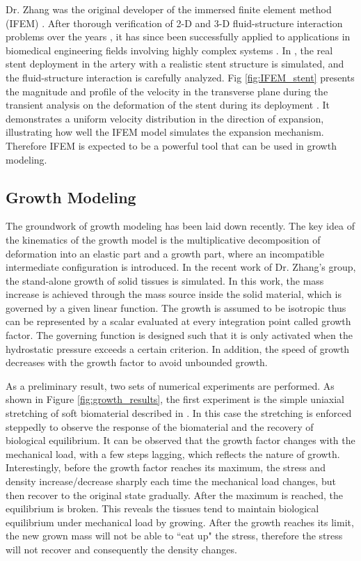 \documentclass[12pt]{article}
\begin{document}
Dr. Zhang was the original developer of the immersed finite element method (IFEM) \cite{Zhang}. After thorough verification of 2-D and 3-D fluid-structure interaction problems over the years \cite{Zhang,Zhang2,Zhang3,Zhang4,Zhang5,Zhang6,Zhang7,Zhang8} , it has since been successfully applied to applications in biomedical engineering fields involving highly complex systems \cite{Zhang9,Zhang10,Zhang11,Zhang12,Zhang13,Zhang14,Zhang15,Zhang18}. In \cite{Zhang10}, the real stent deployment in the artery with a realistic stent structure is simulated, and the fluid-structure interaction is carefully analyzed. Fig \ref{fig:IFEM_stent} presents the magnitude and profile of the velocity in the transverse plane during the transient analysis on the deformation of the stent during its deployment \cite{Zhang10}. It demonstrates a uniform velocity distribution in the direction of expansion, illustrating how well the IFEM model simulates the expansion mechanism. Therefore IFEM is expected to be a powerful tool that can be used in growth modeling. 


\subsection{Growth Modeling}
The groundwork of growth modeling has been laid down recently. The key idea of the kinematics of the growth model is the multiplicative decomposition of deformation into an elastic part and a growth part, where an incompatible intermediate configuration is introduced. In the recent work of Dr. Zhang's group, the stand-alone growth of solid tissues is simulated. In this work, the mass increase is achieved through the mass source inside the solid material, which is governed by a given linear function. The growth is assumed to be isotropic thus can be represented by a scalar evaluated at every integration point called growth factor. The governing function is designed such that it is only activated when the hydrostatic pressure exceeds a certain criterion. In addition, the speed of growth decreases with the growth factor to avoid unbounded growth.

As a preliminary result, two sets of numerical experiments are performed. As shown in Figure \ref{fig:growth_results}, the first experiment is the simple uniaxial stretching of soft biomaterial described in \cite{Himpel}. In this case the stretching is enforced steppedly to observe the response of the biomaterial and the recovery of biological equilibrium. It can be observed that the growth factor changes with the mechanical load, with a few steps lagging, which reflects the nature of growth. Interestingly, before the growth factor reaches its maximum, the stress and density increase/decrease sharply each time the mechanical load changes, but then recover to the original state gradually. After the maximum is reached, the equilibrium is broken. This reveals the tissues tend to maintain biological equilibrium under mechanical load by growing. After the growth reaches its limit, the new grown mass will not be able to ``eat up" the stress, therefore the stress will not recover and consequently the density changes.
\end{document}
